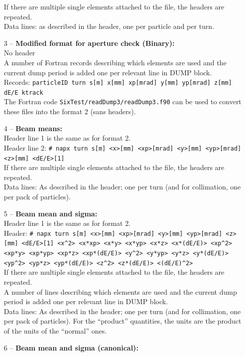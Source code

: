 \begin{enumerate}
        If there are multiple single elements attached to the file, the headers are repeated.\\
	Data lines: as described in the header, one per particle and per turn.
    \item[3] -- \textbf{Modified format for aperture check (Binary):}\\
        No header\\
        A number of Fortran records describing which elements are used and the current dump period is added one per relevant line in DUMP block.\\
        Records: \texttt{particleID turn s[m] x[mm] xp[mrad] y[mm] yp[mrad] z[mm] dE/E ktrack}\\
        The Fortran code \texttt{SixTest/readDump3/readDump3.f90} can be used to convert these files into the format 2 (sans headers).
	\item[4] -- \textbf{Beam means:}\\
        Header line 1 is the same as for format 2.\\
        Header line 2: \texttt{\# napx turn s[m] <x>[mm] <xp>[mrad] <y>[mm] <yp>[mrad] <z>[mm] <dE/E>[1]}\\
        If there are multiple single elements attached to the file, the headers are repeated.\\
        Data lines: As described in the header; one per turn (and for collimation, one per pack of particles).
	\item[5] -- \textbf{Beam mean and sigma:}\\
        Header line 1 is the same as for format 2.\\
	Header: \texttt{\# napx turn s[m] <x>[mm] <xp>[mrad] <y>[mm] <yp>[mrad] <z>[mm] <dE/E>[1] <x\^{}2> <x*xp> <x*y> <x*yp> <x*z> <x*(dE/E)> <xp\^{}2> <xp*y> <xp*yp> <xp*z> <xp*(dE/E)> <y\^{}2> <y*yp> <y*z> <y*(dE/E)> <yp\^{}2> <yp*z> <yp*(dE/E)> <z\^{}2> <z*(dE/E)> <(dE/E)\^{}2>}\\
        If there are multiple single elements attached to the file, the headers are repeated.\\
	A number of lines describing which elements are used and the current dump period is added one per relevant line in DUMP block.\\
	Data lines: As described in the header; one per turn (and for collimation, one per pack of particles).
        For the ``product'' quantities, the units are the product of the units of the ``normal'' ones.
	\item[6] -- \textbf{Beam mean and sigma (canonical):}\\

\end{enumerate}
